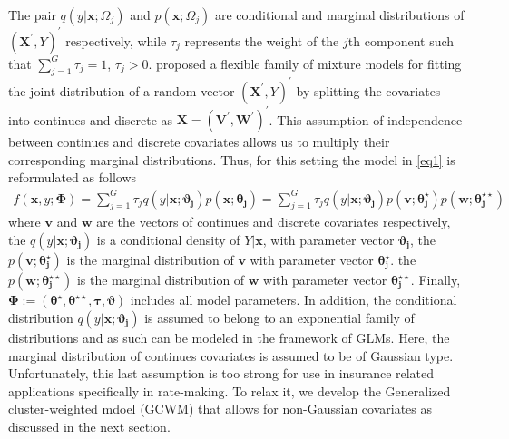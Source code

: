 \documentclass[11pt,letterpaper]{article}
\numberwithin{equation}{section}
\numberwithin{equation}{section}
\numberwithin{equation}{section}
\begin{document}
The pair $q(y|\bm{x};\Omega_j)$ and $p(\bm{x};\Omega_j)$ are conditional and marginal distributions of $(\bm{X^{'}}, Y)^{'}$ respectively, while $\tau_j$ represents the weight of the $j$th component such that $\sum_{j=1}^{G}\tau_j=1$, $\tau_j>0$.
\cite{Ingrassia+Punzo+Vittadini+Minotti:2015} proposed a flexible family of mixture models for fitting the joint distribution of a random vector $(\bm{X^{'}}, Y)^{'}$ by splitting the covariates into continues and discrete as $ \bm{X}=(\bm{V^{'}},  \bm{W^{'}})^{'}$. This assumption of independence between continues and discrete covariates allows us to multiply their corresponding marginal distributions. Thus, for this setting the model in \eqref{eq1} is reformulated as follows
\begin{align}
 f(\bm x, y; \bm{\Phi})= \sum_{j=1}^{G} \tau_j q(y|\bm{x};\bm{\vartheta_j})p(\bm{x};\bm{\theta_j})=\sum_{j=1}^{G} \tau_j q(y|\bm{x};\bm{\vartheta_j})p(\bm{v}; \bm{\theta_j^{\star}})p(\bm{w};\bm{\theta_j^{\star\star}})
\label{eq2}
\end{align}
where $\bm{v}$ and $\bm{w}$ are the vectors of continues and discrete covariates respectively, the $q(y|\bm{x};\bm{\vartheta_j})$ is a conditional density of $Y|\bm{x}$, with parameter vector $\bm{\vartheta_j}$, the $p(\bm{v};\bm{\theta_j^{\star}})$ is the marginal distribution of $\bm{v}$ with parameter vector $\bm{\theta_j^{\star}}$. the $p(\bm{w};\bm{\theta_j^{\star\star}})$ is the marginal distribution of $\bm{w}$ with parameter vector $\bm{\theta_j^{\star\star}}$. Finally, $\bm{\Phi}:=(\bm{\theta^{\star}},\bm{\theta^{\star\star}}, \bm{\tau}, \bm{\vartheta})$ includes all model parameters. %
In addition, the conditional distribution $q(y|\bm{x};\bm{\vartheta_j})$ is assumed to belong to an exponential family of distributions and as such can be modeled in the framework of GLMs. Here, the marginal distribution of continues covariates is assumed to be of Gaussian type. Unfortunately, this last assumption is too strong for use in insurance related applications specifically in rate-making. To relax it, we develop the Generalized cluster-weighted mdoel (GCWM) that allows for non-Gaussian covariates as discussed in the next section.
\end{document}
